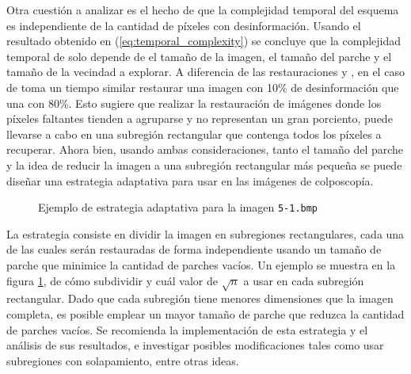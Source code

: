 Otra cuesti\'on a analizar es el hecho de que la complejidad temporal del esquema \SOP es independiente de la cantidad de p\'ixeles con desinformaci\'on. Usando el resultado obtenido en (\ref{eq:temporal_complexity}) se concluye que la complejidad temporal de \SOP solo depende de el tamaño de la imagen, el tamaño del parche y el tamaño de la vecindad a explorar. A diferencia de las restauraciones \TELEA y \NS, en el caso de \SOP toma un tiempo similar restaurar una imagen con 10\% de desinformaci\'on que una con 80\%. Esto sugiere que realizar la restauraci\'on de im\'agenes donde los p\'ixeles faltantes tienden a agruparse y no representan un gran porciento, puede llevarse a cabo en una subregi\'on rectangular que contenga todos los p\'ixeles a recuperar. Ahora bien, usando ambas consideraciones, tanto el tamaño del parche y la idea de reducir la imagen a una subregi\'on rectangular m\'as pequeña se puede diseñar una estrategia adaptativa para usar \SOP en las im\'agenes de colposcop\'ia.

\begin{figure}[H]
	\centering
	\caption{Ejemplo de estrategia adaptativa para la imagen \texttt{5-1.bmp}}
	\label{fig:adaptative}
\end{figure}

La estrategia consiste en dividir la imagen en subregiones rectangulares, cada una de las cuales ser\'an restauradas de forma independiente usando un tamaño de parche que minimice la cantidad de parches vac\'ios. Un ejemplo se muestra en la figura \ref{fig:adaptative}, de c\'omo subdividir y cu\'al valor de $\sqrt{n}$ a usar en cada subregi\'on rectangular. Dado que cada subregi\'on tiene menores dimensiones  que la imagen completa, es posible emplear un mayor tamaño de parche que reduzca la cantidad de parches vacíos. Se recomienda la implementaci\'on de esta estrategia y el análisis de sus resultados, e investigar posibles modificaciones tales como usar subregiones con solapamiento, entre otras ideas.
